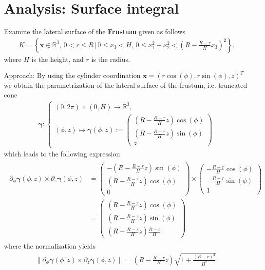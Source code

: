 \documentclass[12pt]{article}
\begin{document}
\section{Analysis: Surface integral}
\begin{exampleboxed}
	Examine the lateral surface of the \textbf{Frustum} given as follows
	\begin{align*}
		K =
		\left\{
		\bm{x} \in \mathbb{R}^3,\,
		0 < r \leq R
		\, \Bigg| \,
		0 \leq x_3 < H,\,
		0 \leq x_1^2 + x_2^2 <
		\left(R - \frac{R-r}{H} x_3\right)^2
		\right\}.
	\end{align*}
	where $H$ is the height, and $r$ is the radius.
\end{exampleboxed}
Approach:
By using the cylinder coordination 
$\bm{x} = (r \cos (\phi), r \sin(\phi),z)^T$
we obtain the parametrization of the lateral surface of the frustum,
i.e. truncated cone
\begin{align*}
	\bm{\gamma}: 
	\begin{cases}
		(0,2\pi)\times (0,H) \to \mathbb{R}^3, \\
		(\phi,z) \mapsto \bm{\gamma}(\phi,z) :=
		\begin{pmatrix} \left(R - \frac{R-r}{H}z\right) \cos(\phi) \\
			\left(R - \frac{R-r}{H}z\right) \sin(\phi) \\
			z
		\end{pmatrix}
	\end{cases}
\end{align*}
which leads to the following expression
\begin{align*}
	\boxed{
		\begin{aligned}
			\partial_{\phi} \bm{\gamma}(\phi,z)\times \partial_z \bm{\gamma}(\phi,z)
			 & = \begin{pmatrix} -\left(R - \frac{R-r}{H}z\right) \sin(\phi) \\
				     \left(R - \frac{R-r}{H}z\right) \cos(\phi)  \\
				     0
			     \end{pmatrix}
			\times
			\begin{pmatrix}
				-\frac{R-r}{H}\cos(\phi) \\-\frac{R-r}{H} \sin(\phi)\\1
			\end{pmatrix}             \\
			 & = \begin{pmatrix}
				     \left(R- \frac{R-r}{H}z\right)\cos(\phi) \\
				     \left(R- \frac{R-r}{H}z\right)\sin(\phi) \\
				     \left(R- \frac{R-r}{H}z\right)\frac{R-r}{H}
			     \end{pmatrix}
		\end{aligned}
	}
\end{align*}
where the normalization yields
\begin{align*}
	\boxed{
		\Big\|
		\partial_{\phi} \bm{\gamma} (\phi,z) \times \partial_z \bm{\gamma} (\phi,z)
		\Big\|
		= \left(R - \frac{R-r}{H}z\right) \sqrt{1 + \frac{(R-r)^2}{H^2}}.
	}
\end{align*}
\end{document}
